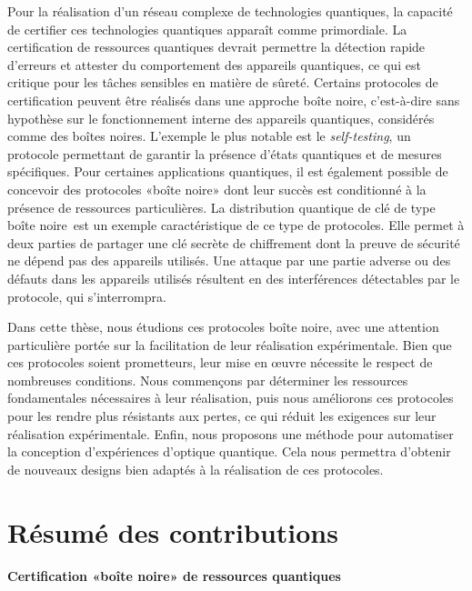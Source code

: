 \medbreak

Pour la réalisation d'un réseau complexe de technologies quantiques, la capacité de certifier ces technologies quantiques apparaît comme primordiale. 
La certification de ressources quantiques devrait permettre la détection rapide d'erreurs et attester du comportement des appareils quantiques, ce qui est critique pour les tâches sensibles en matière de sûreté.
Certains protocoles de certification peuvent être réalisés dans une approche \guillemotleft boîte noire\guillemotright, c'est-à-dire sans hypothèse sur le fonctionnement interne des appareils quantiques, considérés comme des boîtes noires. 
L'exemple le plus notable est le \textit{self-testing}, un protocole permettant de garantir la présence d'états quantiques et de mesures spécifiques.
Pour certaines applications quantiques, il est également possible de concevoir des protocoles «boîte noire» dont leur succès est conditionné à la présence de ressources particulières.
La distribution quantique de clé de type \guillemotleft boîte noire\guillemotright~est un exemple caractéristique de ce type de protocoles. Elle permet à deux parties de partager une clé secrète de chiffrement dont la preuve de sécurité ne dépend pas des appareils utilisés. 
Une attaque par une partie adverse ou des défauts dans les appareils utilisés résultent en des interférences détectables par le protocole, qui s'interrompra.

\medbreak

Dans cette thèse, nous étudions ces protocoles \guillemotleft boîte noire\guillemotright, avec une attention particulière portée sur la facilitation de leur réalisation expérimentale.
Bien que ces protocoles soient prometteurs, leur mise en œuvre nécessite le respect de nombreuses conditions. 
Nous commençons par déterminer les ressources fondamentales nécessaires à leur réalisation, puis nous améliorons ces protocoles pour les rendre plus résistants aux pertes, ce qui réduit les exigences sur leur réalisation expérimentale. 
Enfin, nous proposons une méthode pour automatiser la conception d'expériences d'optique quantique. 
Cela nous permettra d'obtenir de nouveaux designs bien adaptés à la réalisation de ces protocoles.


\section{Résumé des contributions}

\paragraph{Certification «boîte noire» de ressources quantiques} 

